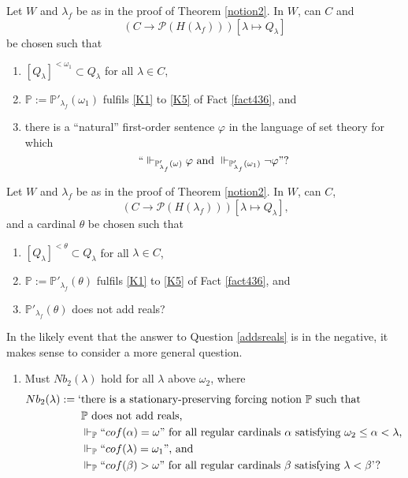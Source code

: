 \documentclass[12pt]{article}
\numberwithin{equation}{section}
\begin{document}
\begin{ques}\label{oq2}
Let $W$ and $\lambda_f$ be as in the proof of Theorem \ref{notion2}. In $W$, can $C$ and $$(C \longrightarrow \mathcal{P}(H(\lambda_f))) [\lambda \mapsto Q_{\lambda}]$$ be chosen such that 
\begin{enumerate}[label=(\arabic*)]
    \item $[Q_{\lambda}]^{< \omega_1} \subset Q_{\lambda}$ for all $\lambda \in C$,
    \item $\mathbb{P} := \mathbb{P}'_{\lambda_f}(\omega_1)$ fulfils \ref{K1} to \ref{K5} of Fact \ref{fact436}, and
    \item there is a ``natural'' first-order sentence $\varphi$ in the language of set theory for which $$``\Vdash_{\mathbb{P}'_{\lambda_f}(\omega)} \varphi \text{ and } \Vdash_{\mathbb{P}'_{\lambda_f}(\omega_1)} \neg \varphi" \text{?}$$
\end{enumerate}
\end{ques}

\begin{ques}\label{addsreals2}
Let $W$ and $\lambda_f$ be as in the proof of Theorem \ref{notion2}. In $W$, can $C$, $$(C \longrightarrow \mathcal{P}(H(\lambda_f))) [\lambda \mapsto Q_{\lambda}] \text{,}$$ and a cardinal $\theta$ be chosen such that
\begin{enumerate}[label=(\arabic*)]
    \item $[Q_{\lambda}]^{< \theta} \subset Q_{\lambda}$ for all $\lambda \in C$,
    \item $\mathbb{P} := \mathbb{P}'_{\lambda_f}(\theta)$ fulfils \ref{K1} to \ref{K5} of Fact \ref{fact436}, and
    \item $\mathbb{P}'_{\lambda_f}(\theta)$ does not add reals?
\end{enumerate}
\end{ques}

In the likely event that the answer to Question \ref{addsreals} is in the negative, it makes sense to consider a more general question.

\begin{enumerate}[label=(Q\arabic*)]
    \item Must $Nb_2(\lambda)$ hold for all $\lambda$ above $\omega_2$, where 
    \begin{align*}
        Nb_2(\lambda) := \text{`} & \text{there is a stationary-preserving forcing notion } \mathbb{P} \text{ such that} \\ 
        & \mathbb{P} \text{ does not add reals,} \\
        & \Vdash_{\mathbb{P}} ``cof(\alpha) = \omega" \text{ for all regular cardinals } \alpha \text{ satisfying } \omega_2 \leq \alpha < \lambda \text{,} \\
        & \Vdash_{\mathbb{P}} ``cof(\lambda) = \omega_1" \text{, and} \\
        & \Vdash_{\mathbb{P}} ``cof(\beta) > \omega" \text{ for all regular cardinals } \beta \text{ satisfying } \lambda < \beta \text{'?}
\end{align*}
\end{enumerate}
\end{document}
